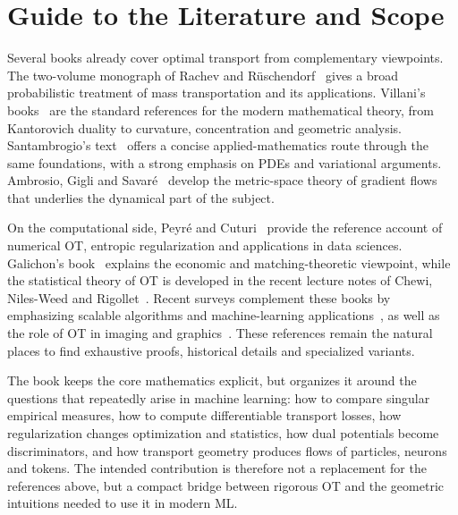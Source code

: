 \documentclass[10pt,a4paper,twoside,openany]{book}
\begin{document}
\chapter*{Guide to the Literature and Scope}

Several books already cover optimal transport from complementary viewpoints. The two-volume monograph of Rachev and R\"uschendorf~\cite{rachev1998mass,rachev1998mass2} gives a broad probabilistic treatment of mass transportation and its applications. Villani's books~\cite{Villani03,Villani09} are the standard references for the modern mathematical theory, from Kantorovich duality to curvature, concentration and geometric analysis. Santambrogio's text~\cite{SantambrogioBook} offers a concise applied-mathematics route through the same foundations, with a strong emphasis on PDEs and variational arguments. Ambrosio, Gigli and Savar\'e~\cite{ambrosio2006gradient} develop the metric-space theory of gradient flows that underlies the dynamical part of the subject.

On the computational side, Peyr\'e and Cuturi~\cite{peyre2019computational} provide the reference account of numerical OT, entropic regularization and applications in data sciences. Galichon's book~\cite{galichon2016optimal} explains the economic and matching-theoretic viewpoint, while the statistical theory of OT is developed in the recent lecture notes of Chewi, Niles-Weed and Rigollet~\cite{weed2025statistical}. Recent surveys complement these books by emphasizing scalable algorithms and machine-learning applications~\cite{khamis2024scalable,montesuma2023recent}, as well as the role of OT in imaging and graphics~\cite{bonneel2023survey}. These references remain the natural places to find exhaustive proofs, historical details and specialized variants.

The book keeps the core mathematics explicit, but organizes it around the questions that repeatedly arise in machine learning: how to compare singular empirical measures, how to compute differentiable transport losses, how regularization changes optimization and statistics, how dual potentials become discriminators, and how transport geometry produces flows of particles, neurons and tokens. The intended contribution is therefore not a replacement for the references above, but a compact bridge between rigorous OT and the geometric intuitions needed to use it in modern ML.

\tableofcontents
\end{document}
